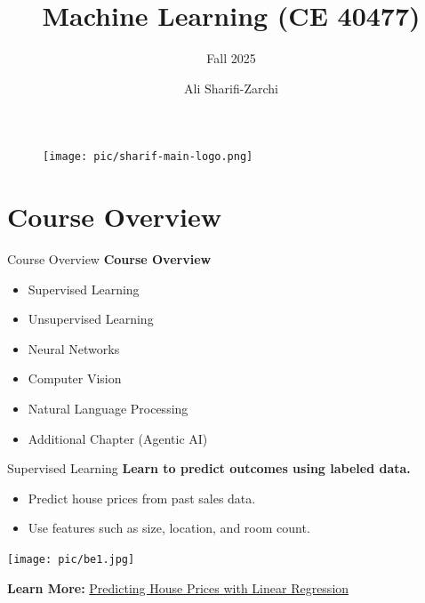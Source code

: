 \documentclass[serif, aspectratio=169]{beamer}
\author{Ali Sharifi-Zarchi}
\title{Machine Learning (CE 40477)}
\subtitle{Fall 2025}
\institute{
    CE Department \\
    Sharif University of Technology
}
\begin{document}
\begin{frame}
    \titlepage
    \vspace*{-0.6cm}
    \begin{figure}[htpb]
    \begin{center}
        \texttt{[image: pic/sharif-main-logo.png]}
    \end{center}
\end{figure}

\end{frame}

\begin{frame}
\tableofcontents[sectionstyle=show,
subsectionstyle=show/shaded/hide,
subsubsectionstyle=show/shaded/hide]
\end{frame}

\section{Course Overview}

\begin{frame}{Course Overview}
\textbf{Course Overview}
\begin{itemize}
    \item Supervised Learning
    \item Unsupervised Learning
    \item Neural Networks
    \item Computer Vision
    \item Natural Language Processing
    \item Additional Chapter (Agentic AI)
\end{itemize}
\end{frame}



\begin{frame}{Supervised Learning}
\textbf{Learn to predict outcomes using labeled data.}

\begin{itemize}
    \item Predict house prices from past sales data.
    \item Use features such as size, location, and room count.
\end{itemize}


\begin{center}
    \centering
    \texttt{[image: pic/be1.jpg]}
\end{center}

\textbf{Learn More:}
\href{https://towardsdatascience.com/predicting-house-prices-with-linear-regression-machine-learning-from-scratch-part-ii-47a0238aeac1}{Predicting House Prices with Linear Regression}
\end{frame}
\end{document}
